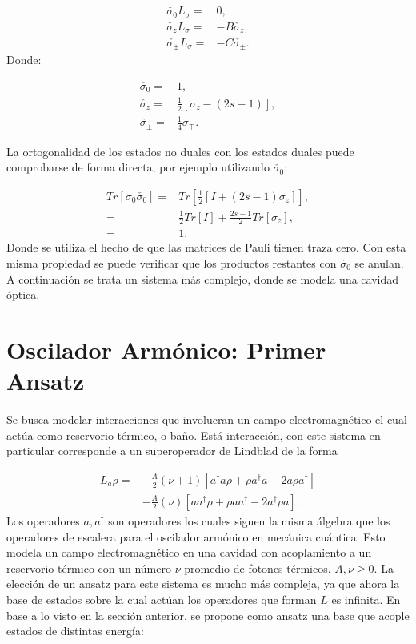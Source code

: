 \documentclass[a4paper,10pt]{report}
\begin{document}
\begin{align}
\check{\sigma_0} L_\sigma  =& 0, \\
\check{\sigma_z} L_\sigma =& -B \check{\sigma_z}, \\
\check{\sigma_{\pm}} L_\sigma =& -C \check{\sigma_{\pm}}.
\end{align} Donde:

\begin{align*}
\check{\sigma_0} =& 1,\\
\check{\sigma_z} =& \frac{1}{2}[\sigma_z-(2s-1)],\\
\check{\sigma_{\pm}} =& \frac{1}{4}\sigma_{\mp}.
\end{align*}

La ortogonalidad de los estados no duales con los estados duales puede comprobarse de forma directa, por ejemplo utilizando $\check{\sigma_0}$:

\begin{align*}
Tr[\sigma_0\check{\sigma_0}] =& Tr[\frac{1}{2}[I + (2s-1)\sigma_z]],\\
=& \frac{1}{2} Tr[I] + \frac{2s-1}{2}Tr[\sigma_z],\\
=& 1.
\end{align*} Donde se utiliza el hecho de que las matrices de Pauli tienen traza cero. Con esta misma propiedad se puede verificar que los productos restantes con $\check{\sigma_0}$ se anulan. A continuación se trata un sistema más complejo, donde se modela una cavidad óptica.

\section{Oscilador Armónico: Primer Ansatz}

Se busca modelar interacciones que involucran un campo electromagnético el cual actúa como reservorio térmico, o baño. Está interacción, con este sistema en particular corresponde a un superoperador de Lindblad de la forma \cite{EnglertDB}

\begin{align}\label{EMField}
L_a \rho =& - \frac{A}{2}(\nu + 1)[a^\dagger a\rho + \rho a^\dagger a -2a\rho a^\dagger] \nonumber \\
 &- \frac{A}{2}(\nu)[ aa^\dagger\rho + \rho  aa^\dagger -2a^\dagger\rho a].
\end{align}Los operadores $a,a^{\dagger}$ son operadores los cuales siguen la misma álgebra que los operadores de escalera para el oscilador armónico en mecánica cuántica. Esto modela un campo electromagnético en una cavidad con acoplamiento a un reservorio térmico con un número $\nu$ promedio de fotones térmicos. $A,\nu \geq 0$. La elección de un ansatz para este sistema es mucho más compleja, ya que ahora la base de estados sobre la cual actúan los operadores que forman $L$ es infinita.  En base a lo visto en la sección anterior, se propone como ansatz una base que acople estados de distintas energía:
\end{document}
